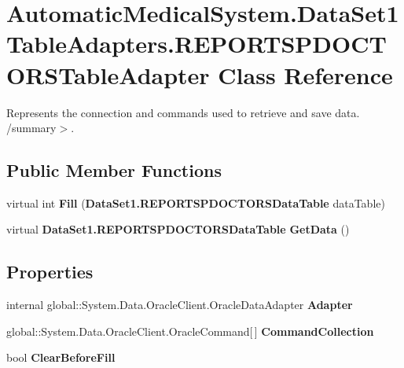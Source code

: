 \section{AutomaticMedicalSystem.DataSet1TableAdapters.REPORTSPDOCTORSTableAdapter Class Reference}
\label{class_automatic_medical_system_1_1_data_set1_table_adapters_1_1_r_e_p_o_r_t_s_p_d_o_c_t_o_r_s_table_adapter}
Represents the connection and commands used to retrieve and save data. /summary$>$.  


\subsection*{Public Member Functions}
\begin{CompactItemize}
\item 
virtual int \textbf{Fill} ({\bf DataSet1.REPORTSPDOCTORSDataTable} dataTable)\label{class_automatic_medical_system_1_1_data_set1_table_adapters_1_1_r_e_p_o_r_t_s_p_d_o_c_t_o_r_s_table_adapter_bb8a39b443a63da62d21f017f5af2c9d}

\item 
virtual {\bf DataSet1.REPORTSPDOCTORSDataTable} \textbf{GetData} ()\label{class_automatic_medical_system_1_1_data_set1_table_adapters_1_1_r_e_p_o_r_t_s_p_d_o_c_t_o_r_s_table_adapter_9f47017f72e208bf5c66b3d525090877}

\end{CompactItemize}
\subsection*{Properties}
\begin{CompactItemize}
\item 
internal global::System.Data.OracleClient.OracleDataAdapter \textbf{Adapter}\hspace{0.3cm}{\tt  [get]}\label{class_automatic_medical_system_1_1_data_set1_table_adapters_1_1_r_e_p_o_r_t_s_p_d_o_c_t_o_r_s_table_adapter_51ab60fc16e22a95790540a8c0f90da9}

\item 
global::System.Data.OracleClient.OracleCommand[$\,$] \textbf{CommandCollection}\hspace{0.3cm}{\tt  [get]}\label{class_automatic_medical_system_1_1_data_set1_table_adapters_1_1_r_e_p_o_r_t_s_p_d_o_c_t_o_r_s_table_adapter_9618888be6152b798ef03a8a84217466}

\item 
bool \textbf{ClearBeforeFill}\hspace{0.3cm}{\tt  [get, set]}\label{class_automatic_medical_system_1_1_data_set1_table_adapters_1_1_r_e_p_o_r_t_s_p_d_o_c_t_o_r_s_table_adapter_6b1a32345054730ff892eaa616699790}

\end{CompactItemize}


